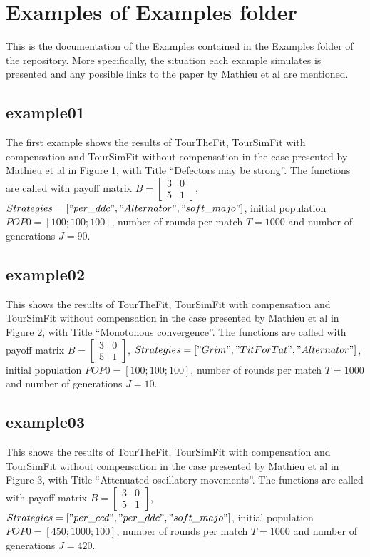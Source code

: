 \section{Examples of Examples folder}
This is the documentation of the Examples contained in the Examples folder of the repository. More specifically, the situation each example simulates is presented and any possible links to the paper by Mathieu et al are mentioned.

\subsection{example01}
The first example shows the results of TourTheFit, TourSimFit with compensation and TourSimFit without compensation in the case presented by Mathieu et al in Figure 1, with Title ``Defectors may be strong''. The functions are called with payoff matrix $B = \begin{bmatrix} 3 & 0 \\ 5 & 1 \end{bmatrix}$, $Strategies = ["per\_ddc", "Alternator", "soft\_majo"]$, initial population $POP0 = [100; 100; 100]$, number of rounds per match $T = 1000$ and number of generations $J = 90$.

\subsection{example02}
This shows the results of TourTheFit, TourSimFit with compensation and TourSimFit without compensation in the case presented by Mathieu et al in Figure 2, with Title ``Monotonous convergence''. The functions are called with payoff matrix $B = \begin{bmatrix} 3 & 0 \\ 5 & 1 \end{bmatrix}$, $Strategies = ["Grim", "TitForTat", "Alternator"]$, initial population $POP0 = [100; 100; 100]$, number of rounds per match $T = 1000$ and number of generations $J = 10$.

\subsection{example03}
This shows the results of TourTheFit, TourSimFit with compensation and TourSimFit without compensation in the case presented by Mathieu et al in Figure 3, with Title ``Attenuated oscillatory movements''. The functions are called with payoff matrix $B = \begin{bmatrix} 3 & 0 \\ 5 & 1 \end{bmatrix}$, $Strategies = ["per\_ccd", "per\_ddc", "soft\_majo"]$, initial population $POP0 = [450; 1000; 100]$, number of rounds per match $T = 1000$ and number of generations $J = 420$.

